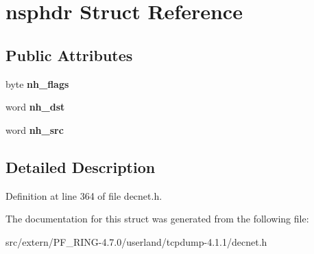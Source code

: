 \hypertarget{structnsphdr}{
\section{nsphdr Struct Reference}
\label{structnsphdr}
}
\subsection*{Public Attributes}
\begin{DoxyCompactItemize}
\item 
\hypertarget{structnsphdr_ad393f83c156e503c045baff20af0b4f5}{
byte {\bfseries nh\_\-flags}}
\label{structnsphdr_ad393f83c156e503c045baff20af0b4f5}

\item 
\hypertarget{structnsphdr_aa6eaf60e2c3701b9afd93513cd4b7b57}{
word {\bfseries nh\_\-dst}}
\label{structnsphdr_aa6eaf60e2c3701b9afd93513cd4b7b57}

\item 
\hypertarget{structnsphdr_ad15a22f53c571dd8cf1e5aba6f2443d2}{
word {\bfseries nh\_\-src}}
\label{structnsphdr_ad15a22f53c571dd8cf1e5aba6f2443d2}

\end{DoxyCompactItemize}


\subsection{Detailed Description}


Definition at line 364 of file decnet.h.



The documentation for this struct was generated from the following file:\begin{DoxyCompactItemize}
\item 
src/extern/PF\_\-RING-\/4.7.0/userland/tcpdump-\/4.1.1/decnet.h\end{DoxyCompactItemize}
